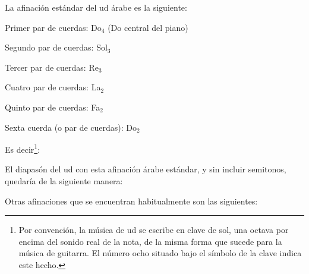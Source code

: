La afinación estándar del ud árabe es la siguiente:

\begin{compactitem}
    \item Primer par de cuerdas: Do$_4$ (Do central del piano)
    \item Segundo par de cuerdas: Sol$_3$
    \item Tercer par de cuerdas: Re$_3$
    \item Cuatro par de cuerdas: La$_2$
    \item Quinto par de cuerdas: Fa$_2$
    \item Sexta cuerda (o par de cuerdas): Do$_2$
\end{compactitem}

Es decir\footnote{Por convención, la música de ud se escribe en clave de sol, una octava por encima del sonido real de la nota, de la misma forma que sucede para la música de guitarra. El número ocho situado bajo el símbolo de la clave indica este hecho.}:

\begin{center}
\end{center}

El diapasón del ud con esta afinación árabe estándar, y sin incluir semitonos, quedaría de la siguiente manera:



Otras afinaciones que se encuentran habitualmente son las siguientes:

\begin{center}
\end{center}

